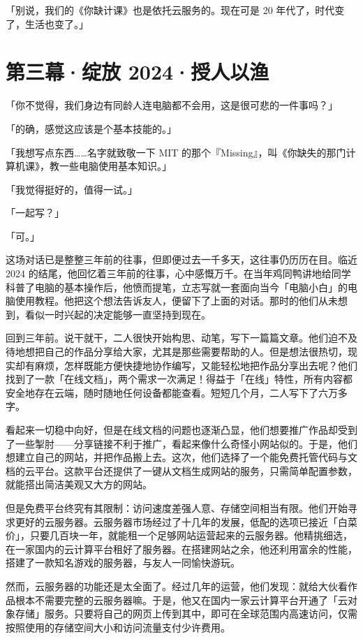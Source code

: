 「别说，我们的《你缺计课》也是依托云服务的。现在可是 20 年代了，时代变了，生活也变了。」

\section{第三幕·绽放 2024·授人以渔}

「你不觉得，我们身边有同龄人连电脑都不会用，这是很可悲的一件事吗？」

「的确，感觉这应该是个基本技能的。」

「我想写点东西……名字就致敬一下 MIT 的那个『Missing』，叫《你缺失的那门计算机课》，教一些电脑使用基本知识。」

「我觉得挺好的，值得一试。」

「一起写？」

「可。」

这场对话已是整整三年前的往事，但即便过去一千多天，这往事仍历历在目。临近 2024 的结尾，他回忆着三年前的往事，心中感慨万千。在当年鸡同鸭讲地给同学科普了电脑的基本操作后，他愤而提笔，立志写就一套面向当今「电脑小白」的电脑使用教程。他把这个想法告诉友人，便留下了上面的对话。那时的他们从未想到，看似一时兴起的决定能够一直坚持到现在。

回到三年前。说干就干，二人很快开始构思、动笔，写下一篇篇文章。他们迫不及待地想把自己的作品分享给大家，尤其是那些需要帮助的人。但是想法很热切，现实却有麻烦，怎样既能方便快捷地协作编写，又能轻松地把作品分享出去呢？他们找到了一款「在线文档」，两个需求一次满足！得益于「在线」特性，所有内容都安全地存在云端，随时随地任何设备都能查看。短短几个月，二人写下了六万多字。

看起来一切稳中向好，但是在线文档的问题也逐渐凸显，他们想要推广作品却受到了一些掣肘——分享链接不利于推广，看起来像什么奇怪小网站似的。于是，他们想建立自己的网站，并把作品搬上去。这次，他们选择了一个能免费托管代码与文档的云平台。这款平台还提供了一键从文档生成网站的服务，只需简单配置参数，就能搭出简洁美观又大方的网站。

但是免费平台终究有其限制：访问速度差强人意、存储空间相当有限。他们开始寻求更好的云服务器。云服务器市场经过了十几年的发展，低配的选项已接近「白菜价」，只要几百块一年，就能租一个足够网站运营起来的云服务器。他精挑细选，在一家国内的云计算平台租好了服务器。在搭建网站之余，他还利用富余的性能，搭建了一款知名游戏的服务器，与友人一同愉快游玩。

然而，云服务器的功能还是太全面了。经过几年的运营，他们发现：就给大伙看作品根本不需要完整的云服务器嘛。于是，他又在国内一家云计算平台开通了「云对象存储」服务。只要将自己的网页上传到其中，即可在全球范围内高速访问，仅需按照使用的存储空间大小和访问流量支付少许费用。

